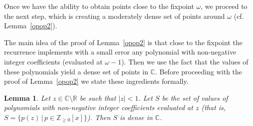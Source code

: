 \documentclass[11pt]{article}
\newtheorem{lemma}[theorem]{Lemma}
\def\Reals{\mathbb{R}}
\def\Complex{\mathbb{C}}
\begin{document}
Once we have the ability to obtain points close to the fixpoint $\omega$, we proceed to the next step, which is creating a moderately dense set of points around $\omega$ (cf. Lemma~\ref{opop2}). 




The main idea of the proof of Lemma~\ref{opop2} is that close to the  fixpoint the recurrence implements with a small error any polynomial with non-negative integer coefficients (evaluated at $\omega-1$). Then we use the fact that the values of these polynomials yield a dense set of points in $\Complex$. Before proceeding with the proof of Lemma~\ref{opop2} we state these ingredients formally.

\begin{lemma}\label{polydense}
Let $z\in\Complex\setminus\Reals$ be such that $|z|<1$. Let $S$ be the set of
values of polynomials with non-negative integer coefficients evaluated at $z$ (that is,
$S=\{ p(z)\,|\, p\in{\mathbb Z_{\geq 0}}[x]\}$). Then $S$ is dense in ${\mathbb C}$.
\end{lemma}
\end{document}
